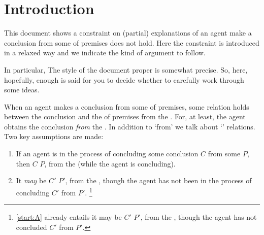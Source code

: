 \chapter{Introduction}
\label{cha:introduction}


\begin{note}
  This document shows a constraint on (partial) explanations of  an agent make a conclusion from some \pool{} of premises does not hold.
  Here the constraint is introduced in a relaxed way and we indicate the kind of argument to follow.

  In particular, The style of the document proper is somewhat precise.
  So, here, hopefully, enough is said for you to decide whether to carefully work through some ideas.
\end{note}


\begin{note}
  When an agent makes a conclusion from some \pool{} of premises, some relation holds between the conclusion and the \pool{} of premises from the \agpe{}.
  For, at least, the agent obtains the conclusion \emph{from} the \pool{}.
  In addition to `from' we talk about `' relations.
  Two key assumptions are made:
  \begin{enumerate}[label=\Alph*., ref=(\Alph*)]
  \item
    \label{start:A}
    If an agent is in the process of concluding some conclusion \(C\) from some \pool{} \(P\), then \(C\) \fof{} \(P\), from the \agpe{} (while the agent is concluding).
  \item
    \label{start:B}
    It \emph{may} be \(C'\) \fof{} \(P'\), from the \agpe{}, though the agent has not been in the process of concluding \(C'\) from \(P'\).%
    \footnote{
      \ref{start:A} already entails it may be \(C'\) \fof{} \(P'\), from the \agpe{}, though the agent has not concluded \(C'\) from \(P'\).
    }
  \end{enumerate}
\end{note}

